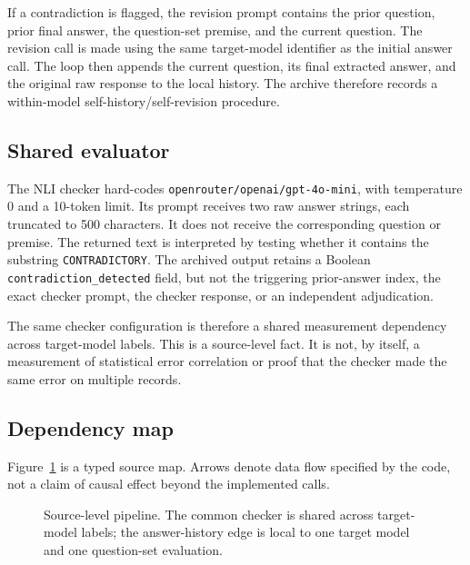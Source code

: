 \documentclass[11pt]{article}
\begin{document}
If a contradiction is flagged, the revision prompt contains the prior question, prior final answer, the question-set premise, and the current question. The revision call is made using the same target-model identifier as the initial answer call. The loop then appends the current question, its final extracted answer, and the original raw response to the local history. The archive therefore records a within-model self-history/self-revision procedure.

\subsection{Shared evaluator}
The NLI checker hard-codes \texttt{openrouter/openai/gpt-4o-mini}, with temperature 0 and a 10-token limit. Its prompt receives two raw answer strings, each truncated to 500 characters. It does not receive the corresponding question or premise. The returned text is interpreted by testing whether it contains the substring \texttt{CONTRADICTORY}. The archived output retains a Boolean \texttt{contradiction\_detected} field, but not the triggering prior-answer index, the exact checker prompt, the checker response, or an independent adjudication.

The same checker configuration is therefore a shared measurement dependency across target-model labels. This is a source-level fact. It is not, by itself, a measurement of statistical error correlation or proof that the checker made the same error on multiple records.

\subsection{Dependency map}
Figure~\ref{fig:pipeline} is a typed source map. Arrows denote data flow specified by the code, not a claim of causal effect beyond the implemented calls.
\begin{figure}[h]
\centering
{}
\caption{Source-level pipeline. The common checker is shared across target-model labels; the answer-history edge is local to one target model and one question-set evaluation.}
\label{fig:pipeline}
\end{figure}
\end{document}
